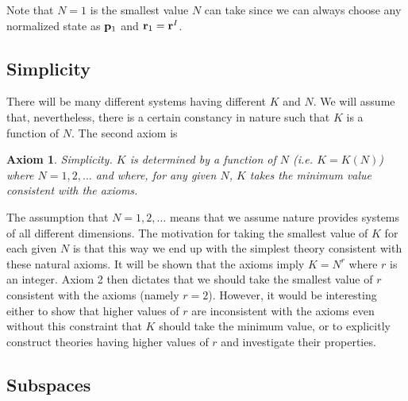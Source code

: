\documentclass[12pt]{article}
\newtheorem{axiom}{Axiom}
\begin{document}
Note that $N=1$ is the smallest value $N$ can take since we can always
choose any normalized state as ${\bf p}_1$ and ${\bf r}_1={\bf r}^I$.

\subsection{Simplicity}

There will be many different systems having different $K$ and $N$.  We
will assume that, nevertheless, there is a certain constancy in nature
such that $K$ is a function of $N$.  The second axiom is
\begin{axiom}
{\rm Simplicity}. $K$ is determined by a function of $N$ (i.e.
$K=K(N)$) where $N=1,2,\dots$ and where, for any given $N$,
$K$ takes the minimum value consistent with the axioms.
\end{axiom}
The assumption that $N=1,2,\dots$ means that we assume nature
provides systems of all different dimensions.
The motivation for taking the smallest value of $K$ for each given $N$
is that this way we end up with the simplest theory consistent with
these natural axioms. It will be shown that the axioms imply
$K=N^r$ where $r$ is an integer. Axiom 2 then dictates that we should
take the smallest value of $r$ consistent with the axioms (namely $r=2$).
However, it would be interesting either to show that higher values of
$r$ are inconsistent with the axioms even without this constraint that
$K$ should take the minimum value, or to explicitly construct theories
having higher values of $r$ and investigate their properties.

\subsection{Subspaces}
\end{document}
